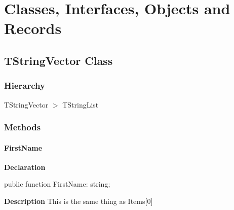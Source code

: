 \documentclass{report}
\newif\ifpdf
\begin{document}
\section{Classes, Interfaces, Objects and Records}
\ifpdf
\subsection*{\large{\textbf{TStringVector Class}}\normalsize\hspace{1ex}\hrulefill}
\else
\subsection*{TStringVector Class}
\fi
\label{PasDoc_StringVector.TStringVector}
\subsubsection*{\large{\textbf{Hierarchy}}\normalsize\hspace{1ex}\hfill}
TStringVector {$>$} TStringList
\subsubsection*{\large{\textbf{Methods}}\normalsize\hspace{1ex}\hfill}
\paragraph*{FirstName}\hspace*{\fill}

\label{PasDoc_StringVector.TStringVector-FirstName}
\begin{list}{}{
\setlength{\itemindent}{0cm}
\setlength{\listparindent}{0cm}
\setlength{\leftmargin}{\evensidemargin}
\addtolength{\leftmargin}{\tmplength}
\settowidth{\labelsep}{X}
\addtolength{\leftmargin}{\labelsep}
\setlength{\labelwidth}{\tmplength}
}
\item[\textbf{Declaration}\hfill]
\ifpdf
\begin{flushleft}
\fi
\begin{ttfamily}
public function FirstName: string;\end{ttfamily}

\ifpdf
\end{flushleft}
\fi

\par
\item[\textbf{Description}]
This is the same thing as Items[0]

\end{list}
\end{document}
